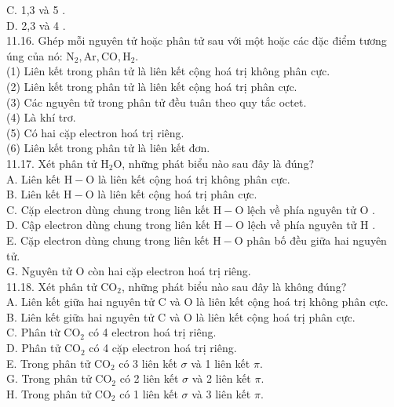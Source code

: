 \documentclass[10pt]{article}
\begin{document}
\begin{enumerate}
C. 1,3 và 5 .\\
D. 2,3 và 4 .\\
11.16. Ghép mỗi nguyên tử hoặc phân tử sau với một hoặc các đặc điểm tương úng của nó: $\mathrm{N}_{2}, \mathrm{Ar}, \mathrm{CO}, \mathrm{H}_{2}$.\\
(1) Liên kết trong phân tử là liên kết cộng hoá trị không phân cực.\\
(2) Liên kết trong phân tử là liên kết cộng hoá trị phân cực.\\
(3) Các nguyên tử trong phân tử đều tuân theo quy tắc octet.\\
(4) Là khí trơ.\\
(5) Có hai cặp electron hoá trị riêng.\\
(6) Liên kết trong phân tử là liên kết đơn.\\
11.17. Xét phân tử $\mathrm{H}_{2} \mathrm{O}$, những phát biểu nào sau đây là đúng?\\
A. Liên kết $\mathrm{H}-\mathrm{O}$ là liên kết cộng hoá trị không phân cực.\\
B. Liên kết $\mathrm{H}-\mathrm{O}$ là liên kết cộng hoá trị phân cực.\\
C. Cặp electron dùng chung trong liên kết $\mathrm{H}-\mathrm{O}$ lệch về phía nguyên tử O .\\
D. Cập electron dùng chung trong liên kết $\mathrm{H}-\mathrm{O}$ lệch về phía nguyên tử H .\\
E. Cặp electron dùng chung trong liên kết $\mathrm{H}-\mathrm{O}$ phân bố đều giữa hai nguyên tử.\\
G. Nguyên tử O còn hai cặp electron hoá trị riêng.\\
11.18. Xét phân tử $\mathrm{CO}_{2}$, những phát biểu nào sau đây là không đúng?\\
A. Liên kết giữa hai nguyên tử C và O là liên kết cộng hoá trị không phân cực.\\
B. Liên kết giữa hai nguyên tử C và O là liên kết cộng hoá trị phân cực.\\
C. Phân từ $\mathrm{CO}_{2}$ có 4 electron hoá trị riêng.\\
D. Phân tử $\mathrm{CO}_{2}$ có 4 cặp electron hoá trị riêng.\\
E. Trong phân tử $\mathrm{CO}_{2}$ có 3 liên kết $\sigma$ và 1 liên kết $\pi$.\\
G. Trong phân tử $\mathrm{CO}_{2}$ có 2 liên kết $\sigma$ và 2 liên kết $\pi$.\\
H. Trong phân tử $\mathrm{CO}_{2}$ có 1 liên kết $\sigma$ và 3 liên kết $\pi$.\\

\end{enumerate}
\end{document}
